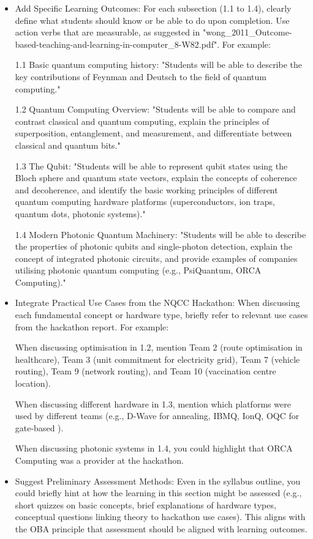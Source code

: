 \documentclass[11pt,a4paper]{article}
\begin{document}
	\begin{itemize}	

	\item Add Specific Learning Outcomes: For each subsection (1.1 to 1.4), clearly define what students should know or be able to do upon completion. Use action verbs that are measurable, as suggested in "wong\_2011\_Outcome-based-teaching-and-learning-in-computer\_8-W82.pdf". For example:

1.1 Basic quantum computing history: "Students will be able to describe the key contributions of Feynman and Deutsch to the field of quantum computing."

1.2 Quantum Computing Overview: "Students will be able to compare and contrast classical and quantum computing, explain the principles of superposition, entanglement, and measurement, and differentiate between classical and quantum bits."

1.3 The Qubit: "Students will be able to represent qubit states using the Bloch sphere and quantum state vectors, explain the concepts of coherence and decoherence, and identify the basic working principles of different quantum computing hardware platforms (superconductors, ion traps, quantum dots, photonic systems)."

1.4 Modern Photonic Quantum Machinery: "Students will be able to describe the properties of photonic qubits and single-photon detection, explain the concept of integrated photonic circuits, and provide examples of companies utilising photonic quantum computing (e.g., PsiQuantum, ORCA Computing)."

	\item Integrate Practical Use Cases from the NQCC Hackathon: When discussing each fundamental concept or hardware type, briefly refer to relevant use cases from the hackathon report. For example:

When discussing optimisation in 1.2, mention Team 2 (route optimisation in healthcare), Team 3 (unit commitment for electricity grid), Team 7 (vehicle routing), Team 9 (network routing), and Team 10 (vaccination centre location).

When discussing different hardware in 1.3, mention which platforms were used by different teams (e.g., D-Wave for annealing, IBMQ, IonQ, OQC for gate-based
).

When discussing photonic systems in 1.4, you could highlight that ORCA Computing was a provider at the hackathon.

	\item Suggest Preliminary Assessment Methods: Even in the syllabus outline, you could briefly hint at how the learning in this section might be assessed (e.g., short quizzes on basic concepts, brief explanations of hardware types, conceptual questions linking theory to hackathon use cases). This aligns with the OBA principle that assessment should be aligned with learning outcomes.


\end{itemize}
\end{document}
